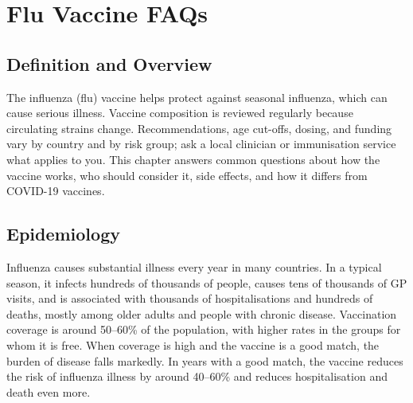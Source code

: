 \chapter{Flu Vaccine FAQs}

\section*{Definition and Overview}
The influenza (flu) vaccine helps protect against seasonal influenza, which can cause serious illness. Vaccine composition is reviewed regularly because circulating strains change. Recommendations, age cut-offs, dosing, and funding vary by country and by risk group; ask a local clinician or immunisation service what applies to you. This chapter answers common questions about how the vaccine works, who should consider it, side effects, and how it differs from COVID-19 vaccines.

\section*{Epidemiology}
Influenza causes substantial illness every year in many countries. In a typical season, it infects hundreds of thousands of people, causes tens of thousands of GP visits, and is associated with thousands of hospitalisations and hundreds of deaths, mostly among older adults and people with chronic disease. Vaccination coverage is around 50--60\% of the population, with higher rates in the groups for whom it is free. When coverage is high and the vaccine is a good match, the burden of disease falls markedly. In years with a good match, the vaccine reduces the risk of influenza illness by around 40--60\% and reduces hospitalisation and death even more.

